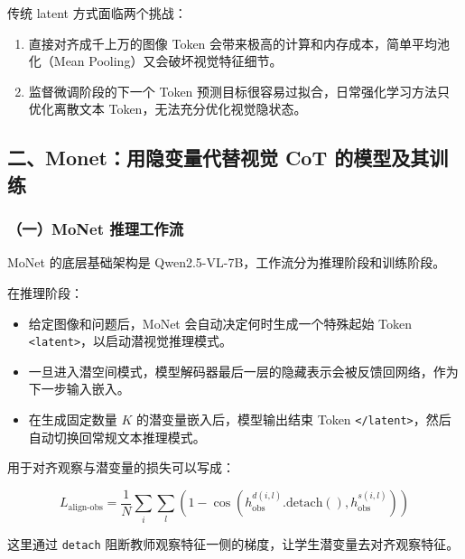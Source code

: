 传统 latent 方式面临两个挑战：

\begin{enumerate}
\def\labelenumi{\arabic{enumi}.}
\tightlist
\item
  直接对齐成千上万的图像 Token 会带来极高的计算和内存成本，简单平均池化（Mean Pooling）又会破坏视觉特征细节。
\item
  监督微调阶段的下一个 Token 预测目标很容易过拟合，日常强化学习方法只优化离散文本 Token，无法充分优化视觉隐状态。
\end{enumerate}

\hypertarget{ux4e8cmonetux7528ux9690ux53d8ux91cfux4ee3ux66ffux89c6ux89c9-cot-ux7684ux6a21ux578bux53caux5176ux8badux7ec3}{%
\subsection{二、Monet：用隐变量代替视觉 CoT 的模型及其训练}\label{ux4e8cmonetux7528ux9690ux53d8ux91cfux4ee3ux66ffux89c6ux89c9-cot-ux7684ux6a21ux578bux53caux5176ux8badux7ec3}}

\hypertarget{ux4e00monet-ux63a8ux7406ux5de5ux4f5cux6d41}{%
\subsubsection{（一）MoNet 推理工作流}\label{ux4e00monet-ux63a8ux7406ux5de5ux4f5cux6d41}}

MoNet 的底层基础架构是 Qwen2.5-VL-7B，工作流分为推理阶段和训练阶段。

在推理阶段：

\begin{itemize}
\tightlist
\item
  给定图像和问题后，MoNet 会自动决定何时生成一个特殊起始 Token \texttt{\textless{}latent\textgreater{}}，以启动潜视觉推理模式。
\item
  一旦进入潜空间模式，模型解码器最后一层的隐藏表示会被反馈回网络，作为下一步输入嵌入。
\item
  在生成固定数量 \(K\) 的潜变量嵌入后，模型输出结束 Token \texttt{\textless{}/latent\textgreater{}}，然后自动切换回常规文本推理模式。
\end{itemize}

用于对齐观察与潜变量的损失可以写成：

\[
L_{\text{align-obs}}
=\frac{1}{N}\sum_i\sum_l
\left(
1-\cos\left(h_{\text{obs}}^{d(i,l)}.\mathrm{detach}(),h_{\text{obs}}^{s(i,l)}\right)
\right)
\]

这里通过 \texttt{detach} 阻断教师观察特征一侧的梯度，让学生潜变量去对齐观察特征。

